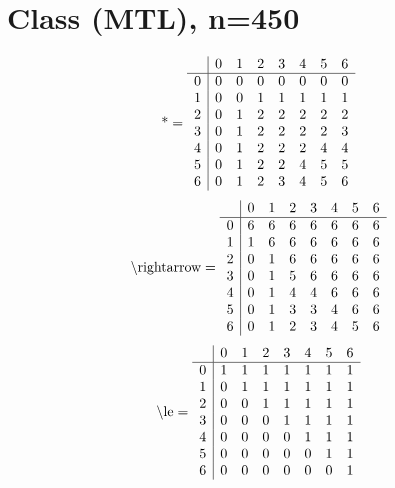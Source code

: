 \documentclass[11pt]{article}
\begin{document}
\section{Class (MTL), n=450}
\[\text{*} = 
\begin{array}{r | r r r r r r r}
 & 0 & 1 & 2 & 3 & 4 & 5 & 6 \\ \hline
0 & 0 & 0 & 0 & 0 & 0 & 0 & 0 \\
1 & 0 & 0 & 1 & 1 & 1 & 1 & 1 \\
2 & 0 & 1 & 2 & 2 & 2 & 2 & 2 \\
3 & 0 & 1 & 2 & 2 & 2 & 2 & 3 \\
4 & 0 & 1 & 2 & 2 & 2 & 4 & 4 \\
5 & 0 & 1 & 2 & 2 & 4 & 5 & 5 \\
6 & 0 & 1 & 2 & 3 & 4 & 5 & 6 \\
\end{array}
\]
\[\text{\textbackslash rightarrow} = 
\begin{array}{r | r r r r r r r}
 & 0 & 1 & 2 & 3 & 4 & 5 & 6 \\ \hline
0 & 6 & 6 & 6 & 6 & 6 & 6 & 6 \\
1 & 1 & 6 & 6 & 6 & 6 & 6 & 6 \\
2 & 0 & 1 & 6 & 6 & 6 & 6 & 6 \\
3 & 0 & 1 & 5 & 6 & 6 & 6 & 6 \\
4 & 0 & 1 & 4 & 4 & 6 & 6 & 6 \\
5 & 0 & 1 & 3 & 3 & 4 & 6 & 6 \\
6 & 0 & 1 & 2 & 3 & 4 & 5 & 6 \\
\end{array}
\]
\[\text{\textbackslash le} = 
\begin{array}{r | r r r r r r r}
 & 0 & 1 & 2 & 3 & 4 & 5 & 6 \\ \hline
0 & 1 & 1 & 1 & 1 & 1 & 1 & 1 \\
1 & 0 & 1 & 1 & 1 & 1 & 1 & 1 \\
2 & 0 & 0 & 1 & 1 & 1 & 1 & 1 \\
3 & 0 & 0 & 0 & 1 & 1 & 1 & 1 \\
4 & 0 & 0 & 0 & 0 & 1 & 1 & 1 \\
5 & 0 & 0 & 0 & 0 & 0 & 1 & 1 \\
6 & 0 & 0 & 0 & 0 & 0 & 0 & 1 \\
\end{array}
\]
\end{document}
